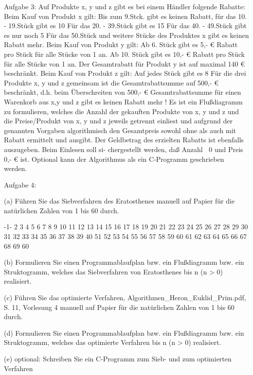 Aufgabe 3: Auf Produkte x, y und z gibt es bei einem Händler folgende Rabatte:
Beim Kauf von Produkt x gilt:
Bis zum 9.Stck. gibt es keinen Rabatt, für das 10. - 19.Stück gibt es 10%
Für das 20. - 39.Stück gibt es 15%
Für das 40. - 49.Stück gibt es nur noch 5 %
Für das 50.Stück und weitere Stücke des Produktes x gibt es keinen Rabatt mehr.
Beim Kauf von Produkt y gilt:
Ab 6. Stück gibt es 5,- € Rabatt pro Stück für alle Stücke von 1 an.
Ab 10. Stück gibt es 10,- € Rabatt pro Stück für alle Stücke von 1 an.
Der Gesamtrabatt für Produkt y ist auf maximal 140 € beschränkt.
Beim Kauf von Produkt z gilt:
Auf jedes Stück gibt es 8%
Für die drei Produkte x, y und z gemeinsam ist die Gesamtrabattsumme auf 500,- €
beschränkt, d.h. beim Überschreiten von 500,- € Gesamtrabattsumme für einen Warenkorb
aus x,y und z gibt es keinen Rabatt mehr !
Es ist ein Flußdiagramm zu formulieren, welches die Anzahl der gekauften Produkte von
x, y und z und die Preise/Produkt von x, y und z jeweils getrennt einliest und aufgrund der
genannten Vorgaben algorithmisch den Gesamtpreis sowohl ohne als auch mit Rabatt ermittelt
und ausgibt. Der Geldbetrag des erzielten Rabatts ist ebenfalls auszugeben. Beim Einlesen soll si-
chergestellt werden, daß Anzahl 0 und Preis  0,- € ist.
Optional kann der Algorithmus als ein C-Programm geschrieben werden.

Aufgabe 4:

(a) Führen Sie das Siebverfahren des Eratosthenes manuell auf Papier für die natürlichen Zahlen von 1 bis 60 durch.

 -1-   2   3   4   5   6   7   8   9  10  11  12  13  14  15  16  17  18  19  20
21  22  23  24  25  26  27  28  29  30  31  32  33  34  35  36  37  38  39  40
51  52  53  54  55  56  57  58  59  60  61  62  63  64  65  66  67  68  69  60


(b) Formulieren Sie einen Programmablaufplan bzw. ein Flußdiagramm bzw. ein Struktogramm, welches das Siebverfahren von Eratosthenes bis n (n > 0) realisiert.

(c) Führen Sie das optimierte Verfahren, Algorithmen_Heron_Euklid_Prim.pdf, S. 11, Vorlesung 4 manuell auf Papier für die natürlichen Zahlen von 1 bis 60 durch.

(d) Formulieren Sie einen Programmablaufplan bzw. ein Flußdiagramm bzw. ein Struktogramm, welches das optimierte Verfahren bis n (n > 0) realisiert.

(e) optional: Schreiben Sie ein C-Programm zum Sieb- und zum optimierten Verfahren

